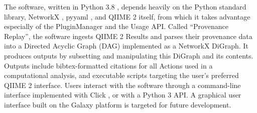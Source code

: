 The software, written in Python 3.8 \parencite{python_software_foundation_python_2001},
depends heavily on the Python standard library, NetworkX \parencite{hagberg_exploring_2008},
pyyaml \parencite{simonov_pyyaml_2006}, and QIIME 2 itself, from which it takes
advantage especially of the PluginManager and the Usage API. Called “Provenance
Replay”, the software ingests QIIME 2 Results and parses their provenance data
into a Directed Acyclic Graph (DAG) implemented as a NetworkX DiGraph. It
produces outputs by subsetting and manipulating this DiGraph and its contents.
Outputs include bibtex-formatted \parencite{boulogne_bibtexparser_nodate}
citations for all Actions used in a computational analysis, and executable
scripts targeting the user’s preferred QIIME 2 interface. Users interact with
the software through a command-line interface implemented with Click \parencite{pallets_click_2014},
or with a Python 3 API. A graphical user interface built on the Galaxy platform
\parencite{afgan_galaxy_2018} is targeted for future development.
